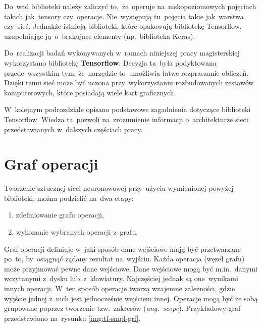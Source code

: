 Do~wad biblioteki należy zaliczyć to,~że~operuje na~niskopoziomowych pojęciach takich jak~tensory czy~operacje.
Nie~występują tu~pojęcia takie jak~warstwa czy~sieć. Jednakże istnieją biblioteki, które opakowują bibliotekę
Tensorflow, uzupełniając ją~o~brakujące elementy (np.~biblioteka Keras).

Do~realizacji badań wykonywanych w~ramach niniejszej pracy magisterskiej wykorzystano bibliotekę \textbf{Tensorflow}.
Decyzja ta~była podyktowana przede~wszystkim tym, że~narzędzie to~umożliwia łatwe rozpraszanie obliczeń. Dzięki temu
sieć może być uczona przy~wykorzystaniu rozbudowanych zestawów komputerowych, które posiadają wiele kart graficznych.

W~kolejnym podrozdziale opisano podstawowe zagadnienia dotyczące biblioteki Tensorflow. Wiedza ta~pozwoli na~zrozumienie
informacji o~architekturze sieci przedstawianych w~dalszych częściach pracy.

\section{Graf operacji} \label{sec:graf-operacji}
\begin{minipage}[t]{\textwidth}
    Tworzenie sztucznej sieci neuronowowej przy~użyciu wymienionej powyżej biblioteki, można podzielić na~dwa etapy:
    \begin{enumerate}
        \item zdefiniowanie grafu operacji,
        \item wykonanie wybranych operacji z~grafu.
    \end{enumerate}
\end{minipage}

Graf operacji definiuje w~jaki sposób dane wejściowe mają być przetwarzane po~to, by~osiągnąć żądany rezultat
na~wyjściu. Każda operacja (węzeł grafu) może przyjmować pewne dane wejściowe. Dane wejściowe mogą być m.in.~danymi
wczytanymi z~dysku lub~z~klawiatury. Najczęściej jednak są one~wynikami innych operacji. W~ten sposób operacje tworzą
wzajemne zależności, gdzie wyjście jednej z~nich jest jednocześnie wejściem innej. Operacje mogą być ze sobą grupowane
poprzez tworzenie tzw.~zakresów (\textit{ang.~scope}). Przykładowy graf przedstawiono na~rysunku \ref{img:tf-smpl-grf}.

